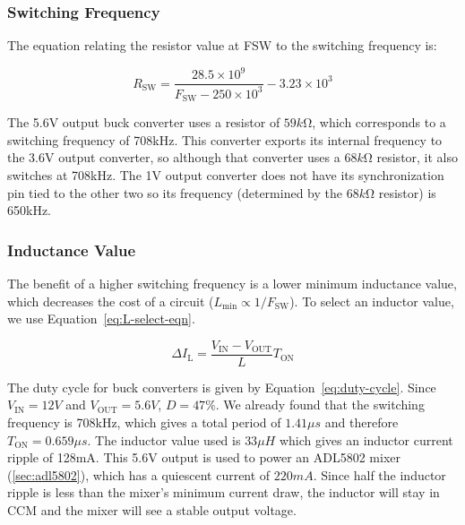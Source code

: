 \subsubsection{Switching Frequency}
\label{sec:l7980-switching-frequency}

The equation relating the resistor value at FSW to the switching frequency is:

\begin{equation}
        R_{\text{SW}}=\frac{28.5\times 10^9}{F_{\text{SW}}-250\times 10^3}-3.23\times 10^3
        \label{eq:l7980-freq}
\end{equation}

The 5.6V output buck converter uses a resistor of $59\si{k\ohm}$, which corresponds to a switching
frequency of 708kHz. This converter exports its internal frequency to the 3.6V output converter, so
although that converter uses a $68\si{k\ohm}$ resistor, it also switches at 708kHz. The 1V output
converter does not have its synchronization pin tied to the other two so its frequency (determined
by the $68\si{k\ohm}$ resistor) is 650kHz.

\subsubsection{Inductance Value}
\label{sec:l7980-inductance-value}

The benefit of a higher switching frequency is a lower minimum inductance value, which decreases the
cost of a circuit ($L_{\text{min}}\propto 1/F_{\text{SW}}$). To select an inductor value, we use
Equation~\ref{eq:L-select-eqn}.

\begin{equation}
        \Delta I_{\text{L}} = \frac{V_{\text{IN}}-V_{\text{OUT}}}{L} T_{\text{ON}}
        \label{eq:L-select-eqn}
\end{equation}

The duty cycle for buck converters is given by Equation~\ref{eq:duty-cycle}. Since
$V_{\text{IN}} = 12V$ and $V_{\text{OUT}} = 5.6V$, $D = 47\%$. We already found that the switching
frequency is 708kHz, which gives a total period of $1. 41\si{\mu s}$ and therefore
$T_{\text{ON}} = 0.659\si{\mu s}$. The inductor value used is $33\si{\mu H}$ which gives an inductor
current ripple of 128mA. This 5.6V output is used to power an ADL5802 mixer (\cref{sec:adl5802}),
which has a quiescent current of $220\si{mA}$. Since half the inductor ripple is less than the
mixer's minimum current draw, the inductor will stay in CCM and the mixer will see a stable output
voltage.

